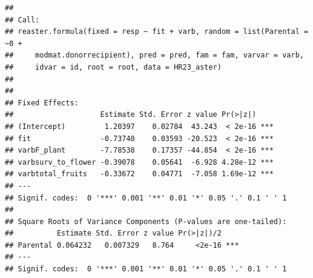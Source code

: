 \documentclass[
]{article}
\begin{document}
\begin{verbatim}
## 
## Call:
## reaster.formula(fixed = resp ~ fit + varb, random = list(Parental = ~0 + 
##     modmat.donorrecipient), pred = pred, fam = fam, varvar = varb, 
##     idvar = id, root = root, data = HR23_aster)
## 
## 
## Fixed Effects:
##                    Estimate Std. Error z value Pr(>|z|)    
## (Intercept)         1.20397    0.02784  43.243  < 2e-16 ***
## fit                -0.73740    0.03593 -20.523  < 2e-16 ***
## varbF_plant        -7.78538    0.17357 -44.854  < 2e-16 ***
## varbsurv_to_flower -0.39078    0.05641  -6.928 4.28e-12 ***
## varbtotal_fruits   -0.33672    0.04771  -7.058 1.69e-12 ***
## ---
## Signif. codes:  0 '***' 0.001 '**' 0.01 '*' 0.05 '.' 0.1 ' ' 1
## 
## Square Roots of Variance Components (P-values are one-tailed):
##          Estimate Std. Error z value Pr(>|z|)/2    
## Parental 0.064232   0.007329   8.764     <2e-16 ***
## ---
## Signif. codes:  0 '***' 0.001 '**' 0.01 '*' 0.05 '.' 0.1 ' ' 1
\end{verbatim}
\end{document}
